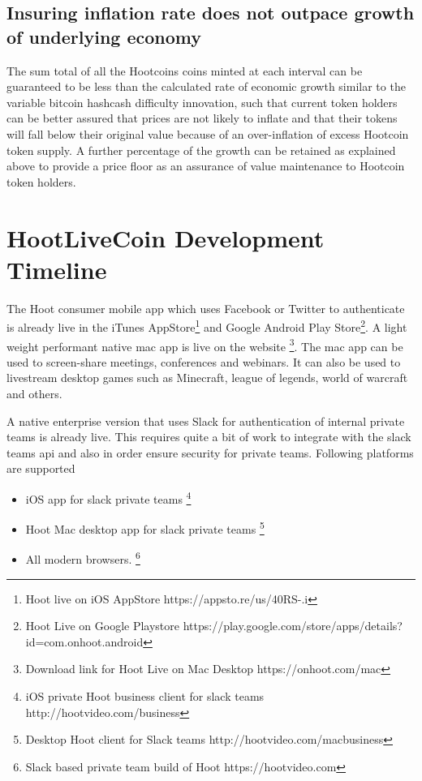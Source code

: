 \documentclass{article}
\begin{document}

\subsection{Insuring inflation rate does not outpace growth of underlying economy}
The sum total of all the Hootcoins coins minted at each interval can be guaranteed to be less than the calculated rate of economic growth similar to the variable bitcoin hashcash difficulty innovation, such that current token holders can be better assured that prices are not likely to inflate and that their tokens will fall below their original value because of an over-inflation of excess Hootcoin token supply.
A further percentage of the growth can be retained as explained above to provide a price floor as an assurance of value maintenance to Hootcoin token holders. 


\section{HootLiveCoin Development Timeline}
The Hoot consumer mobile app which uses Facebook or Twitter to authenticate is already live in the iTunes AppStore\footnote{Hoot live on iOS AppStore https://appsto.re/us/40RS-.i} and Google Android Play Store\footnote{Hoot Live on Google Playstore https://play.google.com/store/apps/details?id=com.onhoot.android}.
A light weight performant native mac app is live on
the website \footnote{Download link for Hoot Live on Mac Desktop https://onhoot.com/mac}. The mac app can be used to screen-share meetings, conferences and webinars. It can also be used
to livestream desktop games such as Minecraft, league of legends,
world of warcraft and others.

A native enterprise version that uses Slack for authentication of
internal private teams is already live.
 This requires quite a bit of work to integrate with the slack teams api and also in order ensure security for private teams. Following platforms are supported
\begin{itemize}

\item iOS app for slack private teams \footnote{ iOS private Hoot business client for slack teams http://hootvideo.com/business}
\item Hoot Mac desktop app for slack private teams \footnote{Desktop Hoot client for Slack teams http://hootvideo.com/macbusiness}
\item All modern browsers. \footnote{Slack based private team build of Hoot https://hootvideo.com}
\end{itemize}
\end{document}
